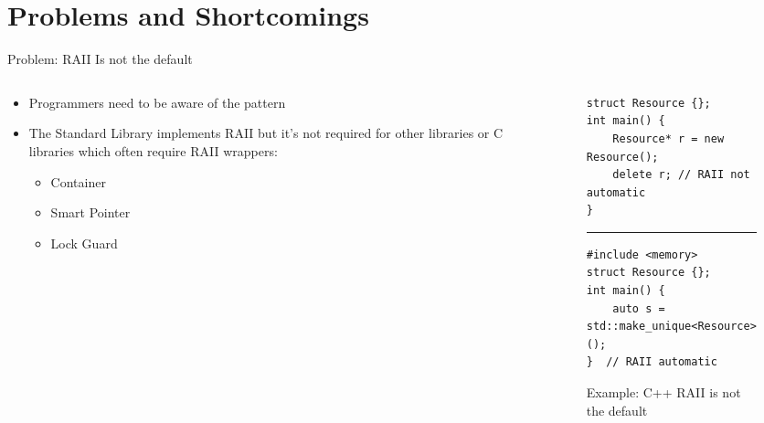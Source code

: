 \section{Problems and Shortcomings}

\begin{frame}[fragile]{Problem: RAII Is not the default}
	\begin{columns}[T,onlytextwidth]
		\begin{column}{0.35\textwidth}
			\begin{itemize}
				\item Programmers need to be aware of the pattern
				\item The Standard Library implements RAII but it's not required for other libraries or C libraries which often require RAII wrappers:
				      \begin{itemize}
					      \item Container
					      \item Smart Pointer
					      \item Lock Guard
				      \end{itemize}
			\end{itemize}
		\end{column}
		\begin{column}{0.6\textwidth}
			\begin{figure}
				\centering
				\begin{verbatim}
struct Resource {};
int main() {
    Resource* r = new Resource();
    delete r; // RAII not automatic
}
                \end{verbatim}
				\rule{\linewidth}{0.5mm}
				\begin{verbatim}
#include <memory>
struct Resource {};
int main() {
    auto s = std::make_unique<Resource>();
}  // RAII automatic
                \end{verbatim}
				\caption{Example: C++ RAII is not the default}
			\end{figure}
		\end{column}
	\end{columns}
\end{frame}

